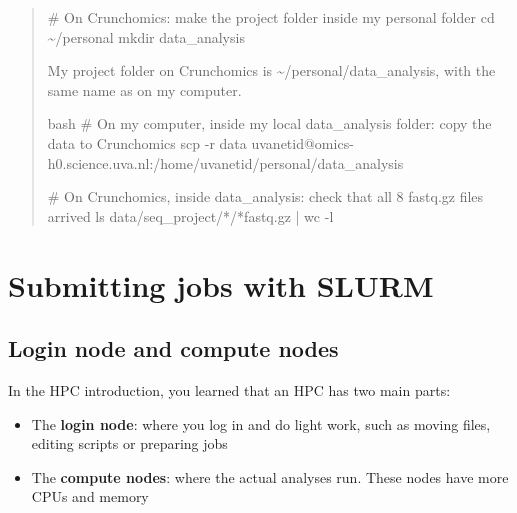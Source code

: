 \documentclass[
  letterpaper,
  DIV=11,
  numbers=noendperiod]{scrreprt}
\newenvironment{Shaded}{}{}
\newcommand{\AttributeTok}[1]{\textcolor[rgb]{0.84,0.23,0.29}{#1}}
\newcommand{\BuiltInTok}[1]{\textcolor[rgb]{0.84,0.23,0.29}{#1}}
\newcommand{\CommentTok}[1]{\textcolor[rgb]{0.42,0.45,0.49}{#1}}
\newcommand{\FunctionTok}[1]{\textcolor[rgb]{0.44,0.26,0.76}{#1}}
\newcommand{\InformationTok}[1]{\textcolor[rgb]{0.42,0.45,0.49}{#1}}
\newcommand{\KeywordTok}[1]{\textcolor[rgb]{0.84,0.23,0.29}{#1}}
\newcommand{\NormalTok}[1]{\textcolor[rgb]{0.14,0.16,0.18}{#1}}
\newcommand{\PreprocessorTok}[1]{\textcolor[rgb]{0.84,0.23,0.29}{#1}}
\providecommand{\tightlist}{%
  \setlength{\itemsep}{0pt}\setlength{\parskip}{0pt}}
\begin{document}
\begin{tcolorbox}
\begin{quote}
\begin{Shaded}
\begin{Highlighting}[]
\CommentTok{\# On Crunchomics: make the project folder inside my personal folder}
\BuiltInTok{cd}\NormalTok{ \textasciitilde{}/personal}
\FunctionTok{mkdir}\NormalTok{ data\_analysis}
\InformationTok{\textasciigrave{}\textasciigrave{}\textasciigrave{}}

\NormalTok{My project folder on Crunchomics is }\InformationTok{\textasciigrave{}\textasciitilde{}/personal/data\_analysis\textasciigrave{}}\NormalTok{, with the same name as on my computer.}

\InformationTok{\textasciigrave{}\textasciigrave{}\textasciigrave{}bash}
\CommentTok{\# On my computer, inside my local data\_analysis folder: copy the data to Crunchomics}
\FunctionTok{scp} \AttributeTok{{-}r}\NormalTok{ data uvanetid@omics{-}h0.science.uva.nl:/home/uvanetid/personal/data\_analysis}

\CommentTok{\# On Crunchomics, inside data\_analysis: check that all 8 fastq.gz files arrived}
\FunctionTok{ls}\NormalTok{ data/seq\_project/}\PreprocessorTok{*}\NormalTok{/}\PreprocessorTok{*}\NormalTok{fastq.gz }\KeywordTok{|} \FunctionTok{wc} \AttributeTok{{-}l}
\InformationTok{\textasciigrave{}\textasciigrave{}\textasciigrave{}}
\end{Highlighting}
\end{Shaded}
\end{quote}

\end{tcolorbox}

\section{Submitting jobs with SLURM}\label{submitting-jobs-with-slurm}

\subsection{Login node and compute
nodes}\label{login-node-and-compute-nodes}

In the HPC introduction, you learned that an HPC has two main parts:

\begin{itemize}
\tightlist
\item
  The \textbf{login node}: where you log in and do light work, such as
  moving files, editing scripts or preparing jobs
\item
  The \textbf{compute nodes}: where the actual analyses run. These nodes
  have more CPUs and memory
\end{itemize}
\end{document}
